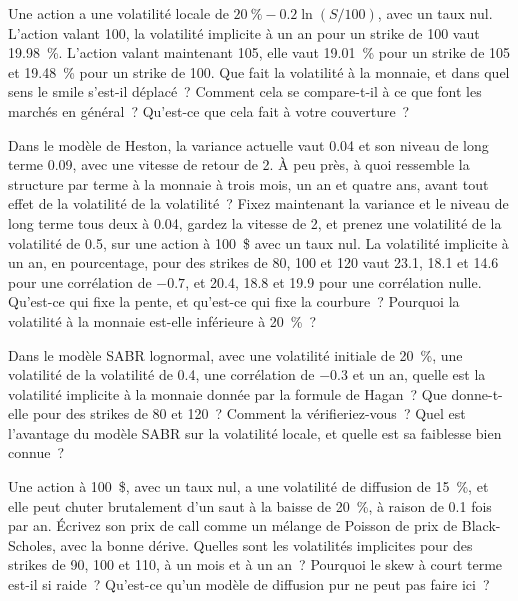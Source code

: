 \begin{question}\label{iq:iv2:vol-surface-and-vol-trading:30}
Une action a une volatilité locale de $20~\% - 0.2\ln(S/100)$, avec un taux nul. L'action valant 100, la volatilité implicite à un an pour un strike de 100 vaut 19.98~\%. L'action valant maintenant 105, elle vaut 19.01~\% pour un strike de 105 et 19.48~\% pour un strike de 100. Que fait la volatilité à la monnaie, et dans quel sens le smile s'est-il déplacé~? Comment cela se compare-t-il à ce que font les marchés en général~? Qu'est-ce que cela fait à votre couverture~?
\end{question}

\begin{question}\label{iq:iv2:vol-surface-and-vol-trading:31}
Dans le modèle de Heston, la variance actuelle vaut 0.04 et son niveau de long terme 0.09, avec une vitesse de retour de 2. À peu près, à quoi ressemble la structure par terme à la monnaie à trois mois, un an et quatre ans, avant tout effet de la volatilité de la volatilité~? Fixez maintenant la variance et le niveau de long terme tous deux à 0.04, gardez la vitesse de 2, et prenez une volatilité de la volatilité de 0.5, sur une action à 100~\$ avec un taux nul. La volatilité implicite à un an, en pourcentage, pour des strikes de 80, 100 et 120 vaut 23.1, 18.1 et 14.6 pour une corrélation de $-0.7$, et 20.4, 18.8 et 19.9 pour une corrélation nulle. Qu'est-ce qui fixe la pente, et qu'est-ce qui fixe la courbure~? Pourquoi la volatilité à la monnaie est-elle inférieure à 20~\%~?
\end{question}

\begin{question}\label{iq:iv2:vol-surface-and-vol-trading:32}
Dans le modèle SABR lognormal, avec une volatilité initiale de 20~\%, une volatilité de la volatilité de 0.4, une corrélation de $-0.3$ et un an, quelle est la volatilité implicite à la monnaie donnée par la formule de Hagan~? Que donne-t-elle pour des strikes de 80 et 120~? Comment la vérifieriez-vous~? Quel est l'avantage du modèle SABR sur la volatilité locale, et quelle est sa faiblesse bien connue~?
\end{question}

\begin{question}\label{iq:iv2:vol-surface-and-vol-trading:33}
Une action à 100~\$, avec un taux nul, a une volatilité de diffusion de 15~\%, et elle peut chuter brutalement d'un saut à la baisse de 20~\%, à raison de 0.1 fois par an. Écrivez son prix de call comme un mélange de Poisson de prix de Black-Scholes, avec la bonne dérive. Quelles sont les volatilités implicites pour des strikes de 90, 100 et 110, à un mois et à un an~? Pourquoi le skew à court terme est-il si raide~? Qu'est-ce qu'un modèle de diffusion pur ne peut pas faire ici~?
\end{question}

